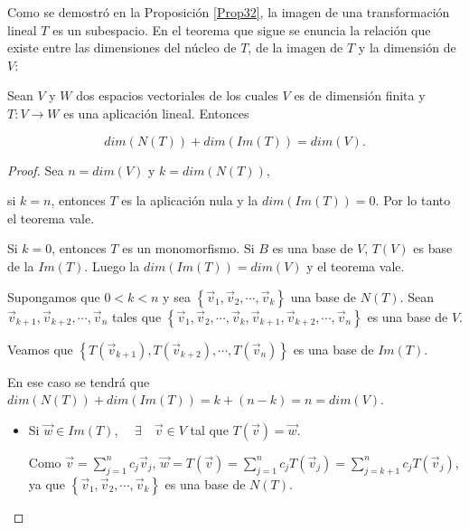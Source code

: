 \bigskip


Como se demostró en la Proposición \ref{Prop32}, la imagen de una transformación lineal $T$ es un subespacio. En el teorema que sigue se enuncia la relación que existe entre las dimensiones  del núcleo de $T$,  de la imagen de $T$ y la dimensión de $V$:

\bigskip



\begin{corollary}
    \label{Prop346}

Sean $V$ y $W$ dos espacios vectoriales de los cuales $V$ es de dimensión finita y  $T: V \rightarrow W$ es  una aplicación lineal. Entonces

$$ dim(N(T))+dim(Im(T))=dim(V).$$


\begin{proof}
Sea  $n=dim(V)$ y $k=dim(N(T))$,  

\bigskip
\noindent
si $k=n$, entonces $T$ es la aplicación nula y la $dim(Im(T))=0$. Por lo tanto el teorema vale.

\bigskip

Si $k=0$, entonces $T$ es un monomorfismo. Si $B$ es una base de $V$, $T(V)$ es base de la $Im(T)$. Luego la $dim(Im(T))=dim(V)$ y el teorema vale.

\bigskip

Supongamos que $0<k<n$ y sea $ \left\{\vec{v}_1,\vec{v}_2,\cdots, \vec{v}_k\right\}$  una base de $N(T)$. Sean $\vec{v}_{k+1},\vec{v}_{k+2},\cdots, \vec{v}_n$ tales que $ \left\{\vec{v}_1,\vec{v}_2,\cdots, \vec{v}_k, \vec{v}_{k+1},\vec{v}_{k+2},\cdots, \vec{v}_n    \right\}$ es una base de $V$.

\bigskip

Veamos que $ \left\{T(\vec{v}_{k+1}),T(\vec{v}_{k+2}),\cdots, T(\vec{v}_n )   \right\}$  es una base de $Im(T)$. 

\bigskip

En ese caso se tendrá que $dim(N(T))+dim(Im(T))=k + (n-k) = n= dim(V)$.

\bigskip

\begin{itemize}
    \item 
    Si $\vec{w}\in Im(T)$, $ \quad \exists \quad \vec{v} \in V $ tal que $T( \vec{v}) = \vec{w}$. 
    
    Como $\vec{v}= \sum_{j=1}^n  c_j \vec{v}_j $,  $\vec{w}=T(\vec{v})= \sum_{j=1}^n  c_j T(\vec{v}_j )= \sum_{j=k+1}^n  c_j T(\vec{v}_j )$,   ya que $ \left\{\vec{v}_1,\vec{v}_2,\cdots, \vec{v}_k\right\}$  es una base de $N(T)$. 
    

\end{itemize}
\end{proof}
\end{corollary}
